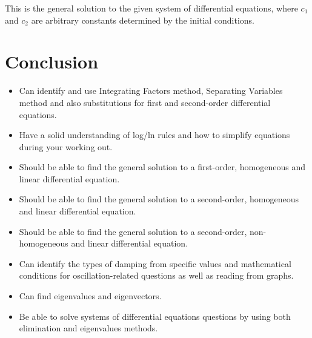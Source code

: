 \documentclass[a4paper,12pt]{article}
\begin{document}
This is the general solution to the given system of differential equations, where $c_1$ and $c_2$ are arbitrary constants determined by the initial conditions.


\section{Conclusion}
\begin{itemize}
    \item Can identify and use Integrating Factors method, Separating Variables method and also substitutions for first and second-order differential equations.
    \item Have a solid understanding of log/ln rules and how to simplify equations during your working out.
    \item Should be able to find the general solution to a first-order, homogeneous and linear differential equation.
    \item Should be able to find the general solution to a second-order, homogeneous and linear differential equation.
    \item Should be able to find the general solution to a second-order, non-homogeneous and linear differential equation.
    \item Can identify the types of damping from specific values and mathematical conditions for oscillation-related questions as well as reading from graphs.
    \item Can find eigenvalues and eigenvectors.
    \item Be able to solve systems of differential equations questions by using both elimination and eigenvalues methods.
\end{itemize}

\vfill
\end{document}
